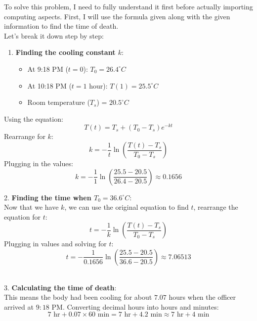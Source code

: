 \documentclass[a4paper, 12pt]{report}
\begin{document}
    To solve this problem, I need to fully understand it first before actually importing computing aspects. First, I will use the formula given along with the given information to find the time of death.\\[4pt]
    Let's break it down step by step:\\[1em]
    \raggedright
    \begin{minipage}{0.55\textwidth}
        \begin{enumerate}[itemsep=-0.1cm]
            \item \textbf{Finding the cooling constant \( k \)}:
            \begin{itemize}
                \item At 9:18 PM (\( t = 0 \)): \( T_0 = 26.4^\circ C \)
                \item At 10:18 PM (\( t = 1 \) hour): \( T(1) = 25.5^\circ C \)
                \item Room temperature (\( T_s \)) = \( 20.5^\circ C \)
            \end{itemize}
        \end{enumerate}
        \centering
        Using the equation:
        \[ T(t) = T_s + (T_0 - T_s)e^{-kt} \]
        Rearrange for \( k \):
        \[ k = -\frac{1}{t} \ln\left(\frac{T(t) - T_s}{T_0 - T_s}\right) \]
        Plugging in the values:
        \[ k = -\frac{1}{1} \ln\left(\frac{25.5 - 20.5}{26.4 - 20.5}\right) \approx 0.1656 \]
    \end{minipage}\hfill
    \begin{minipage}{0.45\textwidth}
        2. \textbf{Finding the time when \( T_0 = 36.6^\circ C \)}:\\
        Now that we have \( k \), we can use the original equation to find \( t \), rearrange the equation for \( t \):
        \[ t = -\frac{1}{k} \ln\left(\frac{T(t) - T_s}{T_0 - T_s}\right) \]
        Plugging in values and solving for \( t \):
        \[ t = -\frac{1}{0.1656} \ln\left(\frac{25.5 - 20.5}{36.6 - 20.5}\right) \approx 7.06513 \]
    \end{minipage}\\
    \vspace{1em}
    3. \textbf{Calculating the time of death}:\\
    This means the body had been cooling for about \( 7.07 \) hours when the officer arrived at \( 9:18 \) PM. Converting decimal hours into hours and minutes:
    \[ 7 \text{ hr} + 0.07 \times 60 \text{ min} = 7 \text{ hr} + 4.2 \text{ min} \approx 7 \text{ hr} + 4 \text{ min} \]
\end{document}
